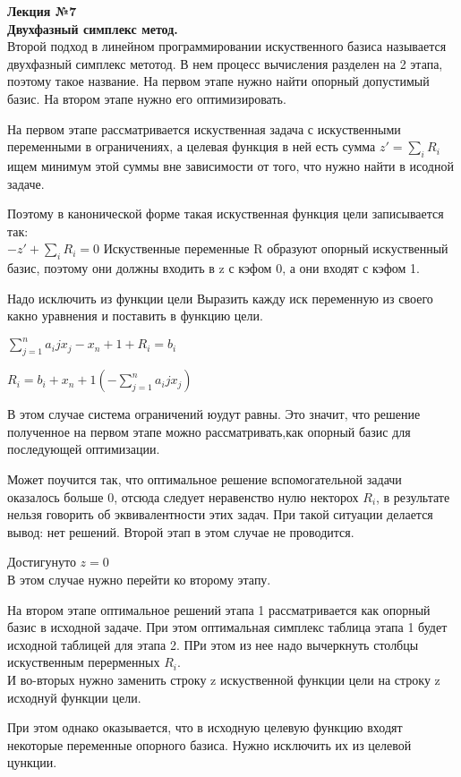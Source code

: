 

\LARGE{ \textbf {Лекция №7}}\\
\Large{ \textbf {Двухфазный симплекс метод.}}\\
Второй подход в линейном программировании искуственного базиса называется двухфазный симплекс метотод.
В нем процесс вычисления разделен на 2 этапа, поэтому такое название.
На первом этапе нужно найти опорный допустимый базис.
На втором этапе нужно его оптимизировать.

На первом этапе рассматривается искуственная задача с искуственными переменными в ограничениях, а целевая функция в ней
есть сумма $z' = \sum\limits_i{R_i} $ ищем минимум этой суммы вне зависимости от того, что нужно найти в исодной задаче.

Поэтому в канонической форме такая искуственная функция цели записывается так:\\
$-z' +  \sum\limits_i{R_i} = 0 $
Искуственные переменные R образуют опорный искуственный базис, поэтому они должны входить в z с кэфом 0, а они входят с кэфом 1.

Надо исключить из функции цели
Выразить кажду иск переменную из своего какно уравнения и поставить в функцию цели.

$
\sum\limits_{j=1}^n{a_ij x_j} - x_n+1 + R_i = b_i
$

$
R_i = b_i +  x_n+1 (- \sum\limits_{j=1}^n{a_ij x_j} )
$

В этом случае система ограничений юудут равны. Это значит, что решение полученное на первом этапе можно рассматривать,как опорный базис для последующей оптимизации.

Может поучится так, что оптимальное решение вспомогательной задачи оказалось больше 0, отсюда следует неравенство нулю некторох $R_i$, в результате нельзя говорить об эквивалентности этих задач.
При такой ситуации делается вывод: нет решений. Второй этап в этом случае не проводится.

Достигунуто $z = 0$\\
В этом случае нужно перейти ко второму этапу.

На втором этапе оптимальное решений этапа 1 рассматривается как опорный базис в исходной задаче.
При этом оптимальная симплекс таблица этапа 1 будет исходной таблицей для этапа 2.
ПРи этом из нее надо вычеркнуть столбцы искуственным перерменных $R_i$. \\
И во-вторых нужно заменить строку z искуственной функции цели на строку z исходнуй функции цели.

При этом однако оказывается, что в исходную целевую функцию входят некоторые переменные опорного базиса.
Нужно исключить их из целевой цункции.

